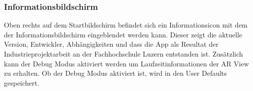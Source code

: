 \subsubsection{Informationsbildschirm}
Oben rechts auf dem Startbildschirm befindet sich ein Informationsicon mit dem der Informationsbildschirm eingeblendet werden kann. Dieser zeigt die aktuelle Version, Entwickler, Abhängigkeiten und dass die App als Resultat der Industrieprojektarbeit an der Fachhochschule Luzern entstanden ist. Zusätzlich kann der Debug Modus aktiviert werden um Laufzeitinformationen der AR View zu erhalten. Ob der Debug Modus aktiviert ist, wird in den User Defaults gespeichert.
